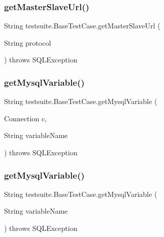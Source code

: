 \subsubsection{\texorpdfstring{get\+Master\+Slave\+Url()}{getMasterSlaveUrl()}\hspace{0.1cm}{\footnotesize\ttfamily [2/2]}}
{\footnotesize\ttfamily String testsuite.\+Base\+Test\+Case.\+get\+Master\+Slave\+Url (\begin{DoxyParamCaption}\item[{String}]{protocol }\end{DoxyParamCaption}) throws S\+Q\+L\+Exception\hspace{0.3cm}{\ttfamily [protected]}}

\mbox{\label{classtestsuite_1_1_base_test_case_a234990bc9494798d81b98dd40e7fe4eb}} 
\subsubsection{\texorpdfstring{get\+Mysql\+Variable()}{getMysqlVariable()}\hspace{0.1cm}{\footnotesize\ttfamily [1/2]}}
{\footnotesize\ttfamily String testsuite.\+Base\+Test\+Case.\+get\+Mysql\+Variable (\begin{DoxyParamCaption}\item[{Connection}]{c,  }\item[{String}]{variable\+Name }\end{DoxyParamCaption}) throws S\+Q\+L\+Exception\hspace{0.3cm}{\ttfamily [protected]}}

\mbox{\label{classtestsuite_1_1_base_test_case_ac50ae23586e12eaab184308368a6fb1d}} 
\subsubsection{\texorpdfstring{get\+Mysql\+Variable()}{getMysqlVariable()}\hspace{0.1cm}{\footnotesize\ttfamily [2/2]}}
{\footnotesize\ttfamily String testsuite.\+Base\+Test\+Case.\+get\+Mysql\+Variable (\begin{DoxyParamCaption}\item[{String}]{variable\+Name }\end{DoxyParamCaption}) throws S\+Q\+L\+Exception\hspace{0.3cm}{\ttfamily [protected]}}

